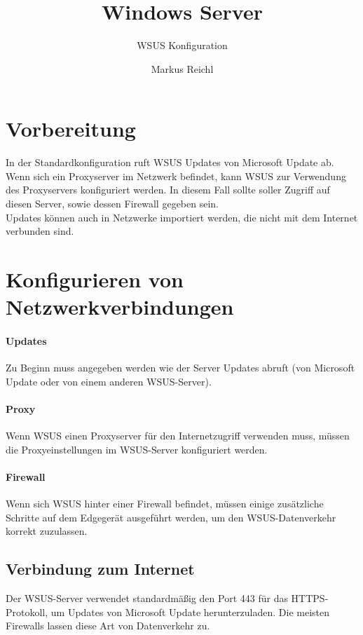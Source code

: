 \documentclass{preset/school}
\title{Windows Server}
\subtitle{WSUS Konfiguration}
\author{Markus Reichl}
\begin{document}
\maketitle
\tableofcontents

\newpage
\section{Vorbereitung}
In der Standardkonfiguration ruft WSUS Updates von Microsoft Update ab. Wenn sich ein Proxyserver im Netzwerk befindet, kann WSUS zur Verwendung des Proxyservers konfiguriert werden.
In diesem Fall sollte soller Zugriff auf diesen Server, sowie dessen Firewall gegeben sein.\\
Updates können auch in Netzwerke importiert werden, die nicht mit dem Internet verbunden sind.

\section{Konfigurieren von Netzwerkverbindungen}
\paragraph{Updates}
Zu Beginn muss angegeben werden wie der Server Updates abruft (von Microsoft Update oder von einem anderen WSUS-Server).
\paragraph{Proxy}
Wenn WSUS einen Proxyserver für den Internetzugriff verwenden muss, müssen die Proxyeinstellungen im WSUS-Server konfiguriert werden.
\paragraph{Firewall}
Wenn sich WSUS hinter einer Firewall befindet, müssen einige zusätzliche Schritte auf dem Edgegerät ausgeführt werden, um den WSUS-Datenverkehr korrekt zuzulassen.

\subsection{Verbindung zum Internet}
Der WSUS-Server verwendet standardmäßig den Port 443 für das HTTPS-Protokoll, um Updates von Microsoft Update herunterzuladen. Die meisten Firewalls lassen diese Art von Datenverkehr zu.
\end{document}
